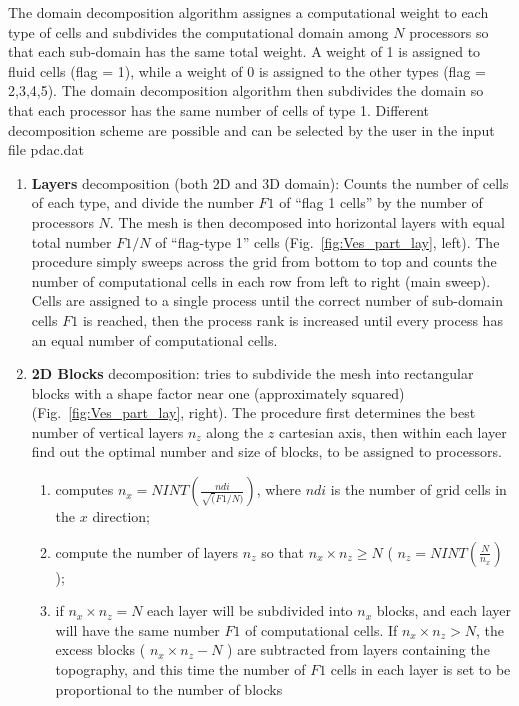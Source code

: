 The domain decomposition algorithm assignes a computational weight to each type 
of cells and subdivides the computational domain
among $N$ processors so that each sub-domain has the same total weight.
A weight of 1 is assigned to fluid cells (flag = 1),
while a weight of 0 is assigned to the other types (flag = 2,3,4,5). 
The domain decomposition algorithm then subdivides the domain so that each processor
has the same number of cells of type 1. Different decomposition scheme are possible
and can be selected by the user in the input file pdac.dat \\
\begin{enumerate}
\item {\bf Layers} decomposition (both 2D and 3D domain): 
Counts the number of cells of each type, and divide the number $F1$ of ``flag 1 cells''
by the number of processors $N$. The mesh is then decomposed into horizontal layers with equal total number
$F1/N$ of ``flag-type 1'' cells (Fig.~\ref{fig:Ves_part_lay}, left). The procedure simply sweeps across
the grid from bottom to top and counts the number of computational cells in each row from
left to right (main sweep). Cells are assigned to a single process until the correct number 
of sub-domain cells $F1$ is reached, then the process rank is increased until every 
process has an equal number of computational cells.
\item {\bf  2D Blocks } decomposition: tries to subdivide the mesh
into rectangular blocks with a shape factor near one (approximately squared) 
(Fig.~\ref{fig:Ves_part_lay}, right). The procedure first determines the best number
of vertical layers $n_z$ along the $z$ cartesian axis, then within each 
layer find out the optimal number and size of blocks, to be assigned to processors.
\begin{enumerate}
\item computes $\displaystyle n_x = NINT\left(\frac{ndi}{\sqrt(F1/N)}\right)$, where $ndi$ is the
number of grid cells in the $x$ direction;
\item compute the number of layers $n_z$ so that $n_x \times n_z \ge N$ 
( $\displaystyle n_z = NINT\left(\frac{N}{n_x}\right)$ );
\item if $n_x \times n_z = N$ each layer will be subdivided into $n_x$ blocks, and each layer
will have the same number $F1$ of computational cells. If $n_x \times n_z > N$, the excess blocks
( $n_x \times n_z - N$ ) are subtracted from layers containing the topography, and this time
the number of $F1$ cells in each layer is set to be proportional to the number of blocks

\end{enumerate}
\end{enumerate}
